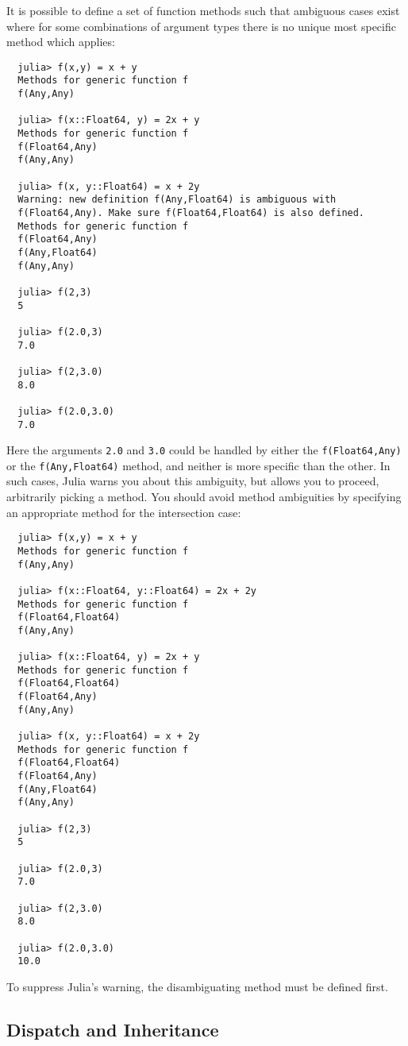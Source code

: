 \documentclass{article}
\renewcommand{\sec}[1]{\label{sec:#1}}
\begin{document}
It is possible to define a set of function methods such that ambiguous cases exist where for some combinations of argument types there is no unique most specific method which applies:
\begin{verbatim}
  julia> f(x,y) = x + y
  Methods for generic function f
  f(Any,Any)

  julia> f(x::Float64, y) = 2x + y
  Methods for generic function f
  f(Float64,Any)
  f(Any,Any)

  julia> f(x, y::Float64) = x + 2y
  Warning: new definition f(Any,Float64) is ambiguous with
  f(Float64,Any). Make sure f(Float64,Float64) is also defined.
  Methods for generic function f
  f(Float64,Any)
  f(Any,Float64)
  f(Any,Any)

  julia> f(2,3)
  5

  julia> f(2.0,3)
  7.0

  julia> f(2,3.0)
  8.0

  julia> f(2.0,3.0)
  7.0
\end{verbatim}
Here the arguments \verb|2.0| and \verb|3.0| could be handled by either the \verb|f(Float64,Any)| or the \verb|f(Any,Float64)| method, and neither is more specific than the other.
In such cases, Julia warns you about this ambiguity, but allows you to proceed, arbitrarily picking a method.
You should avoid method ambiguities by specifying an appropriate method for the intersection case:
\begin{verbatim}
  julia> f(x,y) = x + y
  Methods for generic function f
  f(Any,Any)

  julia> f(x::Float64, y::Float64) = 2x + 2y
  Methods for generic function f
  f(Float64,Float64)
  f(Any,Any)

  julia> f(x::Float64, y) = 2x + y
  Methods for generic function f
  f(Float64,Float64)
  f(Float64,Any)
  f(Any,Any)

  julia> f(x, y::Float64) = x + 2y
  Methods for generic function f
  f(Float64,Float64)
  f(Float64,Any)
  f(Any,Float64)
  f(Any,Any)

  julia> f(2,3)
  5

  julia> f(2.0,3)
  7.0

  julia> f(2,3.0)
  8.0

  julia> f(2.0,3.0)
  10.0
\end{verbatim}
To suppress Julia's warning, the disambiguating method must be defined first.

\subsection{Dispatch and Inheritance}\sec{dispatch-and-inheritance}
\end{document}

